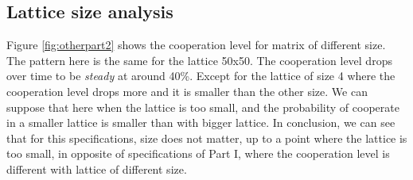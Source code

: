 \documentclass[letterpaper]{article}
\begin{document}
\subsection{Lattice size analysis}

Figure \ref{fig:otherpart2} shows the cooperation level for matrix of
different size. The pattern here is the same for the lattice 50x50. The
cooperation level drops over time to be \textit{steady} at around 40\%.
Except for the lattice of size 4 where the cooperation level drops more and
it is smaller than the other size. We can suppose that here when the
lattice is too small, and the probability of cooperate in a smaller lattice
is smaller than with bigger lattice. In conclusion, we can see that for
this specifications,
size does not matter, up to a point where the lattice is too small,
in opposite of specifications of Part I, where the cooperation level
is different
with lattice of different size.
\end{document}
